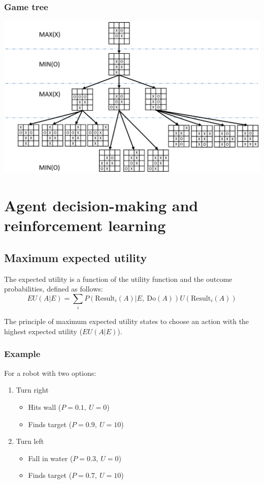 \documentclass[11pt]{article}
\begin{document}
\subsubsection{Game tree}
\label{sec:org1f78fe6}
\begin{center}
\includegraphics[width=.9\linewidth]{./images/othello-4-game-tree.png}
\end{center}

 \newpage
\section{Agent decision-making and reinforcement learning}
\label{sec:orga0b5977}

\subsection{Maximum expected utility}
\label{sec:orge060394}
The expected utility is a function of the utility function and the outcome probabilities, defined as follows:
\[EU (A | E) = \sum_i P (\text{Result}_i (A) | E, \ \text{Do} (A)) U (\text{Result}_i (A))\]

The principle of maximum expected utility states to choose an action with the highest expected utility (\(EU (A | E)\)).
\subsubsection{Example}
\label{sec:orgcc2a168}
For a robot with two options:
\begin{enumerate}
\item Turn right
\begin{itemize}
\item Hits wall (\(P = 0.1, \ U = 0\))
\item Finds target (\(P = 0.9, \ U = 10\))
\end{itemize}
\item Turn left
\begin{itemize}
\item Fall in water (\(P = 0.3, \ U = 0\))
\item Finds target (\(P = 0.7, \ U = 10\))
\end{itemize}
\end{enumerate}
\end{document}
